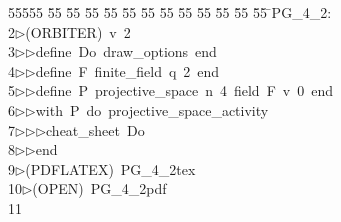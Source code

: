 %
%
\begin{tabbing}
55555 \= 55 \= 55 \= 55 \= 55 \= 55 \= 55 \= 55 \= 55 \= 55 \= 55 \= 55 \= 55 \= \>PG\_4\_2:\\[0pt]
2\>$\triangleright$\>(ORBITER)\ v\ 2\ \\[0pt]
3\>$\triangleright$\>$\triangleright$\>define\ Do\ draw\_options\ end\ \\[0pt]
4\>$\triangleright$\>$\triangleright$\>define\ F\ finite\_field\ q\ 2\ end\ \\[0pt]
5\>$\triangleright$\>$\triangleright$\>define\ P\ projective\_space\ n\ 4\ field\ F\ v\ 0\ end\ \\[0pt]
6\>$\triangleright$\>$\triangleright$\>with\ P\ do\ projective\_space\_activity\ \\[0pt]
7\>$\triangleright$\>$\triangleright$\>$\triangleright$\>cheat\_sheet\ Do\ \\[0pt]
8\>$\triangleright$\>$\triangleright$\>end\\[0pt]
9\>$\triangleright$\>(PDFLATEX)\ PG\_4\_2tex\ \\[0pt]
10\>$\triangleright$\>(OPEN)\ PG\_4\_2pdf\\[0pt]
11\>\end{tabbing}
